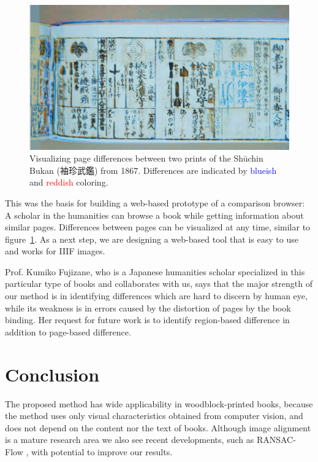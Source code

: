 \documentclass{ltjarticle}
\begin{document}
\begin{figure}
    \centering
    \includegraphics[width=\textwidth]{200019646_00006}
    \caption[Visualizing page differences]{Visualizing page differences between two prints of the Shūchin Bukan (袖珍武鑑) from 1867. Differences are indicated by \textcolor{blue}{blueish} and \textcolor{red}{reddish} coloring.}
    \label{fig:page-compare}
\end{figure}

This was the basis for building a web-based prototype of a comparison browser: A scholar in the humanities can browse a book while getting information about similar pages. Differences between pages can be visualized at any time, similar to figure~\ref{fig:page-compare}. As a next step, we are designing a web-based tool that is easy to use and works for IIIF images.

Prof. Kumiko Fujizane, who is a Japanese humanities scholar specialized in this particular type of books and collaborates with us, says that the major strength of our method is in identifying differences which are hard to discern by human eye, while its weakness is in errors caused by the distortion of pages by the book binding. Her request for future work is to identify region-based difference in addition to page-based difference.

\section{Conclusion}

The proposed method has wide applicability in woodblock-printed books, because the method uses only visual characteristics obtained from computer vision, and does not depend on the content nor the text of books. Although image alignment is a mature research area we also see recent developments, such as RANSAC-Flow \cite{shen2019ransac}, with potential to improve our results.

\printbibliography
\end{document}
